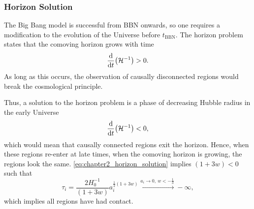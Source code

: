 \subsubsection{Horizon Solution}

The Big Bang model is successful from BBN onwards, so one requires a modification to the evolution of the Universe before \(t_{\text{BBN}}\).
The horizon problem states that the comoving horizon grows with time
%
\begin{equation}
	\dv{t} \big(\mathcal{H}^{-1}\big)
	> 0.
\end{equation}
%
As long as this occurs, the observation of causally disconnected regions would break the cosmological principle.

Thus, a solution to the horizon problem is a phase of decreasing Hubble radius in the early Universe
%
\begin{equation}\label{eq:chapter2_horizon_solution}
	\dv{t} \big(\mathcal{H}^{-1}\big)
	< 0,
\end{equation}
%
which would mean that causally connected regions exit the horizon.
Hence, when these regions re-enter at late times, when the comoving horizon is growing, the regions look the same.
\cref{eq:chapter2_horizon_solution} implies \((1+3w) < 0\) such that
%
\begin{equation}
	\tau_{i}
	= \frac{2H_{0}^{-1}}{(1+3w)} a_{i}^{\frac{1}{2}(1+3w)}
	\xrightarrow{a_{i} \rightarrow 0,\ w < -\frac{1}{3}} -\infty,
\end{equation}
%
which implies all regions have had contact.

